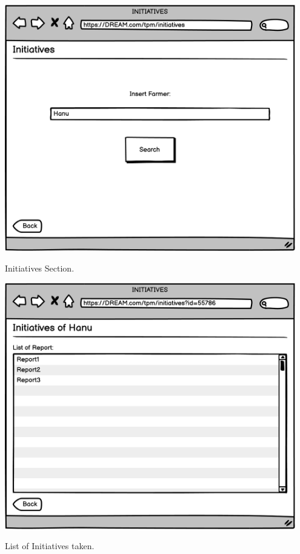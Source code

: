 \begin{minipage}{.5\textwidth}
	\centering
	\includegraphics[width=0.95\textwidth]{Images/Mockup/TPM/11TPMInitiatives.png}
	\captionsetup{type=figure}
	\caption{Initiatives Section.}
\end{minipage}%
\begin{minipage}{.5\textwidth}
	\centering
	\includegraphics[width=0.95\textwidth]{Images/Mockup/TPM/12TPMInitiativesFarmer.png}
	\captionsetup{type=figure}
	\caption{List of Initiatives taken.}
\end{minipage}
\vspace{0.5cm}
